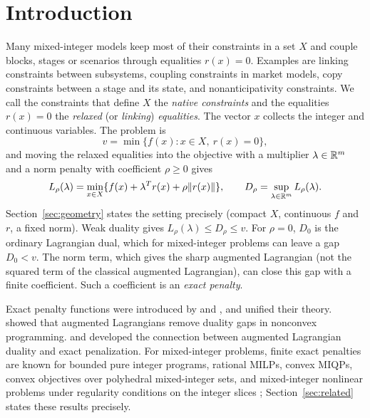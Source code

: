 \section{Introduction}\label{sec:intro}
Many mixed-integer models keep most of their constraints in a set $X$
and couple blocks, stages or scenarios through equalities $r(x)=0$.
Examples are linking constraints between subsystems, coupling
constraints in market models, copy constraints between a stage and its
state, and nonanticipativity constraints. We call the constraints that
define $X$ the \emph{native constraints} and the equalities $r(x)=0$
the \emph{relaxed} (or \emph{linking}) \emph{equalities}. The vector $x$ collects the integer and
continuous variables. The problem is
\[
 v=\min\{f(x):x\in X,\ r(x)=0\},
\]
and moving the relaxed equalities into the objective with a multiplier
$\lambda\in\mathbb R^m$ and a norm penalty with coefficient $\rho\ge0$ gives
\[
 L_\rho(\lambda)=\min_{x\in X}\{f(x)+\lambda^Tr(x)+\rho\lVert r(x)\rVert\},
 \qquad
 D_\rho=\sup_{\lambda\in\mathbb R^m}L_\rho(\lambda).
\]
Section~\ref{sec:geometry} states the setting precisely
(compact $X$, continuous $f$ and $r$, a fixed norm). Weak duality gives
$L_\rho(\lambda)\le D_\rho\le v$. For $\rho=0$, $D_0$ is the ordinary
Lagrangian dual, which for mixed-integer problems can leave a gap
$D_0<v$. The norm term, which gives the sharp augmented Lagrangian (not
the squared term of the classical augmented Lagrangian), can close this
gap with a finite coefficient. Such a coefficient is an
\emph{exact penalty}.

Exact penalty functions were introduced by \citet{Eremin1966} and
\citet{Zangwill1967}, and \citet{Burke1991} unified their theory.
\citet{Rockafellar1974} showed that augmented Lagrangians remove duality
gaps in nonconvex programming. \citet{RockafellarWets1998} and
\citet{HuangYang2003} developed the connection between augmented
Lagrangian duality and exact penalization. For mixed-integer problems,
finite exact penalties are known for bounded pure integer programs,
rational MILPs, convex MIQPs, convex objectives over polyhedral
mixed-integer sets, and mixed-integer nonlinear problems under
regularity conditions on the integer slices
\citep{BolandEberhard2015,FeizollahiAhmedSun2017,GuAhmedDey2020,Bhardwaj2024,LefebvreSchmidt2025};
Section~\ref{sec:related} states these results precisely.

